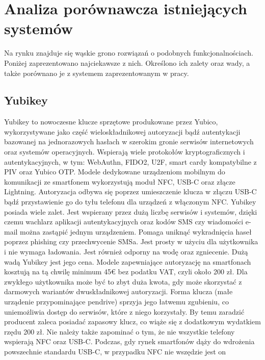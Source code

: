 \section{Analiza porównawcza istniejących systemów}
Na rynku znajduje się wąskie grono rozwiązań o podobnych funkcjonalnościach. Poniżej zaprezentowano najciekawsze z nich. Określono ich zalety oraz
wady, a także porównano je z systemem zaprezentowanym w pracy.
\subsection{Yubikey}
Yubikey to nowoczesne klucze sprzętowe produkowane przez Yubico, wykorzystywane jako część wieloskładnikowej autoryzacji bądź autentykacji
bazowanej na jednorazowych hasłach w szerokim gronie serwisów internetowych oraz systemów operacyjnych. Wspierają wiele protokołów kryptograficznych
i autentykacyjnych, w tym: WebAuthn, FIDO2, U2F, smart cardy kompatybilne z PIV oraz Yubico OTP. Modele dedykowane urządzeniom mobilnym
do komunikacji ze smartfonem wykorzystują moduł NFC, USB-C oraz złącze Lightning. Autoryzacja odbywa się poprzez umieszczenie klucza w złączu USB-C
bądź przystawienie go do tyłu telefonu dla urządzeń z włączonym NFC\cite{Yubikey}.
\newline\newline
\indent Yubikey posiada wiele zalet. Jest wspierany przez dużą liczbę serwisów i systemów, dzięki czemu wachlarz aplikacji autentykacyjnych oraz kodów SMS
czy wiadomości e-mail można zastąpić jednym urządzeniem. Pomaga uniknąć wykradnięcia haseł poprzez phishing czy przechwycenie SMSa. Jest prosty w
użyciu dla użytkownika i nie wymaga ładowania. Jest również odporny na wodę oraz zgniecenie.
\newline\newline
\indent Dużą wadą Yubikey jest jego cena. Modele zapewniające autoryzację na smartfonach kosztują na tą chwilę minimum 45€ bez podatku VAT\cite{Yubi-Price}, czyli około 200 zł.
Dla zwykłego użytkownika może być to zbyt duża kwota, gdy może skorzystać z darmowych wariantów dwuskładnikowej autoryzacji. Forma klucza
(małe urządenie przypominające pendrive) sprzyja jego łatwemu zgubieniu, co uniemożliwia dostęp do serwisów, które z niego korzystały. By temu
zaradzić producent zaleca posiadać zapasowy klucz, co wiąże się z dodatkowym wydatkiem rzędu 200 zł. Nie należy także zapominać o tym, że nie wszystkie
telefony wspierają NFC oraz USB-C. Podczas, gdy rynek smartfonów dąży do wdrożenia powszechnie standardu USB-C, w przypadku NFC nie wszędzie jest on
